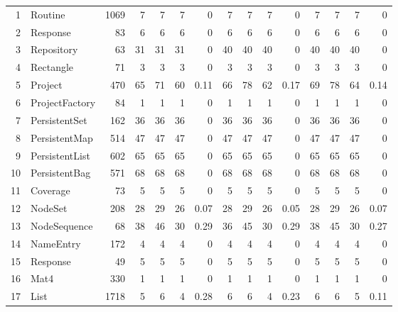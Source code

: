 \documentclass{acm_proc_article-sp}
\begin{document}
\begin{table} [htp!]
{\begin{tabularx}{1.17 \textwidth}{r l r r r r r r r r r r r r r}
 1						& Routine					&1069		& 7		&	7	&	7	& 	0					& 7		&  7		& 7		& 		0			& 7			& 7			& 7			&	0	\\
 2						& Response					&83		& 6		&	6	&	6	& 	0					& 6		&  6		& 6		& 		0			& 6			& 6			& 6			&	0	\\
 3						& Repository					&63		& 31		&	31	&	31	& 	0					& 40		&  40		& 40		& 		0			& 40			& 40			& 40			&	0	\\      
 4						& Rectangle					&71		& 3		&	3	&	3	& 	0					& 3		&  3 		& 3		& 		0			& 3			& 3			& 3			&	0	\\      
 5						& Project					&470		& 65		&	71	&	60	& 	0.11					& 66		&  78		& 62		& 		0.17			& 69			& 78			& 64			&	0.14	\\      
 6						& ProjectFactory				&84		& 1		&	1	&	1	& 	0					& 1		&  1		& 1		& 		0			& 1			& 1			& 1			&	0	\\      
 7						& PersistentSet				&162		& 36		&	36	&	36	& 	0					& 36		&  36		& 36		& 		0			& 36			& 36			& 36 			&	0	\\      
 8						& PersistentMap				&514		& 47		&	47	&	47	& 	0					& 47		&  47		& 47		& 		0			& 47			& 47			& 47			&	0	\\      
 9						& PersistentList				&602		& 65		&	65	&	65	& 	0					& 65		&  65		& 65		& 		0			& 65			& 65			& 65			&	0	\\      
 10						& PersistentBag				&571		& 68		&	68	&	68	& 	0					& 68		&  68		& 68		& 		0			& 68			& 68			& 68			&	0	\\      
 11						& Coverage					&73		& 5		&	5	&	5	& 	0					& 5		& 5		& 5		& 		0			& 5			& 5			& 5			&	0	\\      
 12						& NodeSet					&208		& 28		&	29	&	26	& 	0.07					& 28		& 29 		& 26		& 		0.05			& 28			& 29			& 26			&	0.07	\\      
 13						& NodeSequence				&68		& 38		&	46	&	30	& 	0.29					& 36		& 45 		& 30		& 		0.29			& 38			& 45			& 30			&	0.27	\\      
 14						& NameEntry					&172		& 4		&	4	&	4	& 	0					& 4		& 4 		& 4		& 		0			& 4			& 4			& 4			&	0	\\      
 15						& Response					&49		& 5		&	5	&	5	& 	0					& 5		& 5 		& 5		& 		0			& 5			& 5			& 5			&	0	\\      
 16						& Mat4					&330		& 1		&	1	&	1	& 	0					& 1		&  1		& 1		& 		0			& 1			& 1			& 1			&	0	\\      
 17						& List						&1718		& 5		&	6	&	4	& 	0.28					& 6		& 6 		& 4		& 		0.23			& 6			& 6			& 5			&	0.11\\      

\end{tabularx}}
\end{table}
\end{document}
